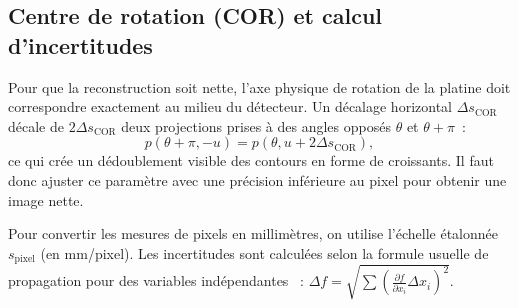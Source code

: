 \subsection{Centre de rotation (COR) et calcul d'incertitudes}
Pour que la reconstruction soit nette, l'axe physique de rotation de la platine doit correspondre exactement au milieu du détecteur. Un décalage horizontal $\Delta s_{\text{COR}}$ décale de $2 \Delta s_{\text{COR}}$ deux projections prises à des angles opposés $\theta$ et $\theta + \pi$~:
\begin{equation}
    p(\theta + \pi, -u) = p(\theta, u + 2 \Delta s_{\text{COR}}),
    \label{eq:cor_error}
\end{equation}
ce qui crée un dédoublement visible des contours en forme de croissants. Il faut donc ajuster ce paramètre avec une précision inférieure au pixel pour obtenir une image nette.

Pour convertir les mesures de pixels en millimètres, on utilise l'échelle étalonnée $s_{\text{pixel}}$ (en mm/pixel). Les incertitudes sont calculées selon la formule usuelle de propagation pour des variables indépendantes~\cite{bevington2003data} : $\Delta f = \sqrt{\sum (\frac{\partial f}{\partial x_i} \Delta x_i)^2}$.
